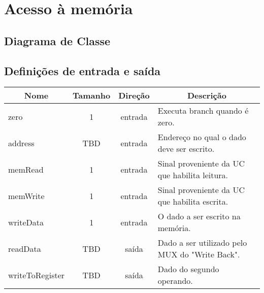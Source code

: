 \section{Acesso à memória}
	\subsection{Diagrama de Classe}
  \begin{figure}[H]
    
  \end{figure}

\subsection{Definições de entrada e saída}

	\begin{center}
        \begin{longtable}[pos]{| l | c | c | m{7cm} |} \hline
          \multicolumn{1}{|c|}{\cellcolor[gray]{0.9}\textbf{Nome}} & 
          \multicolumn{1}{c|}{\cellcolor[gray]{0.9}\textbf{Tamanho}} & 
          \multicolumn{1}{c|}{\cellcolor[gray]{0.9}\textbf{Direção}} &
          \multicolumn{1}{c|}{\cellcolor[gray]{0.9}\textbf{Descrição}} \\ \hline
          \endhead
          \hline
          \endlastfoot

          zero          	       & 1   & entrada   & Executa branch quando é zero.    \\ \hline
          address                  & TBD & entrada   & Endereço no qual o dado deve ser escrito.    \\ \hline
          memRead                  & 1   & entrada   & Sinal proveniente da UC que habilita leitura.    \\ \hline
          memWrite                 & 1   & entrada   & Sinal proveniente da UC que habilita escrita.    \\ \hline
          writeData      		   & 1   & entrada   & O dado a ser escrito na memória. \\ \hline
          readData	               & TBD & saída     & Dado a ser utilizado pelo MUX do "Write Back".    \\ \hline
          writeToRegister          & TBD & saída     & Dado do segundo operando.    \\
        \end{longtable}
      \end{center}